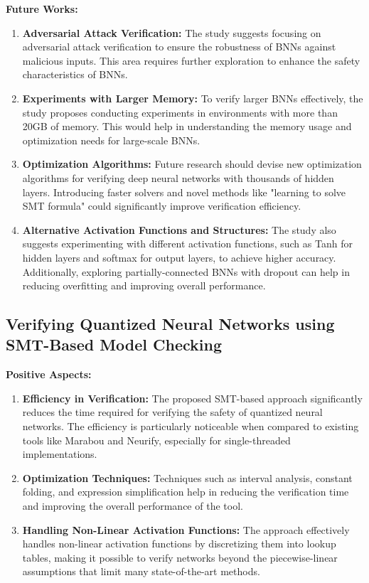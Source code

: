 \documentclass[conference]{IEEEtran}
\begin{document}
\textbf{Future Works:}
\begin{enumerate}
    \item \textbf{Adversarial Attack Verification:} The study suggests focusing on adversarial attack verification to ensure the robustness of BNNs against malicious inputs. This area requires further exploration to enhance the safety characteristics of BNNs.
    \item \textbf{Experiments with Larger Memory:} To verify larger BNNs effectively, the study proposes conducting experiments in environments with more than 20GB of memory. This would help in understanding the memory usage and optimization needs for large-scale BNNs.
    \item \textbf{Optimization Algorithms:} Future research should devise new optimization algorithms for verifying deep neural networks with thousands of hidden layers. Introducing faster solvers and novel methods like "learning to solve SMT formula" could significantly improve verification efficiency.
    \item \textbf{Alternative Activation Functions and Structures:} The study also suggests experimenting with different activation functions, such as Tanh for hidden layers and softmax for output layers, to achieve higher accuracy. Additionally, exploring partially-connected BNNs with dropout can help in reducing overfitting and improving overall performance.
\end{enumerate}

\subsection{Verifying Quantized Neural Networks using SMT-Based Model Checking \cite{c7}}

\textbf{Positive Aspects:}
\begin{enumerate}
    \item \textbf{Efficiency in Verification:} The proposed SMT-based approach significantly reduces the time required for verifying the safety of quantized neural networks. The efficiency is particularly noticeable when compared to existing tools like Marabou and Neurify, especially for single-threaded implementations.
    \item \textbf{Optimization Techniques:} Techniques such as interval analysis, constant folding, and expression simplification help in reducing the verification time and improving the overall performance of the tool.
    \item \textbf{Handling Non-Linear Activation Functions:} The approach effectively handles non-linear activation functions by discretizing them into lookup tables, making it possible to verify networks beyond the piecewise-linear assumptions that limit many state-of-the-art methods.
\end{enumerate}
\end{document}
